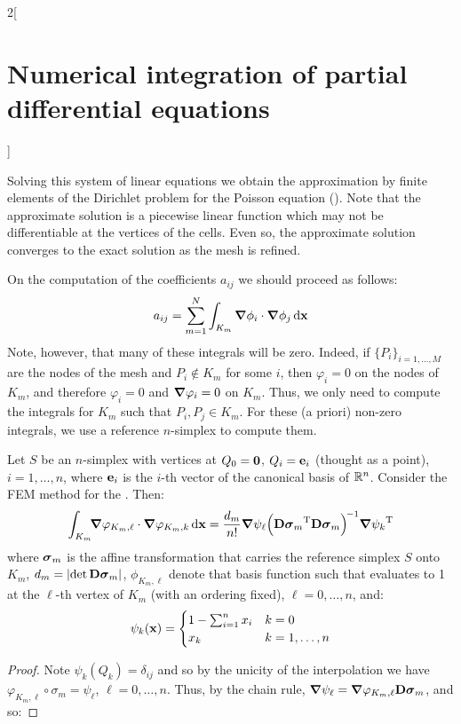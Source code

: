 \documentclass[../../../main_math.tex]{subfiles}
\begin{document}
\begin{multicols}{2}[\section{Numerical integration of partial differential equations}]
  \begin{remark}
    Solving this system of linear equations we obtain the approximation by finite elements of the Dirichlet problem for the Poisson equation (). Note that the approximate solution is a piecewise linear function which may not be differentiable at the vertices of the cells. Even so, the approximate solution converges to the exact solution as the mesh is refined.
  \end{remark}
  \begin{remark}
    On the computation of the coefficients $a_{ij}$ we should proceed as follows:
    $$
      a_{ij}=\sum_{m=1}^N\int_{K_m} \grad{\phi_i}\cdot\grad{\phi_j}\dd{\boldsymbol{\mathrm{x}}}
    $$
    Note, however, that many of these integrals will be zero. Indeed, if $\{P_i\}_{i=1,\ldots,M}$ are the nodes of the mesh and $P_i\notin K_m$ for some $i$, then $\varphi_i=0$ on the nodes of $K_m$, and therefore $\varphi_i=0$ and $\grad{\varphi_i}=0$ on $K_m$. Thus, we only need to compute the integrals for $K_m$ such that $P_i, P_j\in K_m$. For these (a priori) non-zero integrals, we use a reference $n$-simplex to compute them.
  \end{remark}
  \begin{proposition}
    Let $S$ be an $n$-simplex with vertices at $Q_0=\boldsymbol{\mathrm{0}}$, $Q_i=\boldsymbol{\mathrm{e}}_i$ (thought as a point), $i=1,\ldots,n$, where $\boldsymbol{\mathrm{e}}_i$ is the $i$-th vector of the canonical basis of $\mathbb{R}^n$. Consider the FEM method for the . Then:
    \begin{equation*}
      \int_{K_m}\!\!\grad\varphi_{K_m,\ell}\cdot \grad\varphi_{K_m,k}\dd{\boldsymbol{\mathrm{x}}} =\frac{d_m}{n!}{\grad\psi_\ell}{\left({\boldsymbol{\mathrm{D\sigma}}_m}^{\mathrm{T}}\boldsymbol{\mathrm{D\sigma}}_m\right)}^{\!-1}{\grad\psi_k}^{\mathrm{T}}
    \end{equation*}
    where $\boldsymbol{\mathrm{\sigma}}_m$ is the affine transformation that carries the reference simplex $S$ onto $K_m$, $d_m=\abs{\det\boldsymbol{\mathrm{D\sigma}}_m}$, $\phi_{K_m,\ell}$ denote that basis function such that evaluates to 1 at the $\ell$-th vertex of $K_m$ (with an ordering fixed), $\ell =0,\ldots,n$, and:
    $$
      \psi_k(\boldsymbol{\mathrm{x}})=\begin{cases}
        1-\sum_{i=1}^n x_i & k=0          \\
        x_k                & k=1,\ldots,n
      \end{cases}
    $$
  \end{proposition}
  \begin{proof}
    Note $\psi_k(Q_k)=\delta_{ij}$ and so by the unicity of the interpolation we have $\varphi_{K_m,\ell}\circ \sigma_m=\psi_\ell$, $\ell=0,\ldots,n$. Thus, by the chain rule, $\grad\psi_\ell=\grad\varphi_{K_m,\ell}{\boldsymbol{\mathrm{D\sigma}}_m}$, and so:

\end{proof}
\end{multicols}
\end{document}
